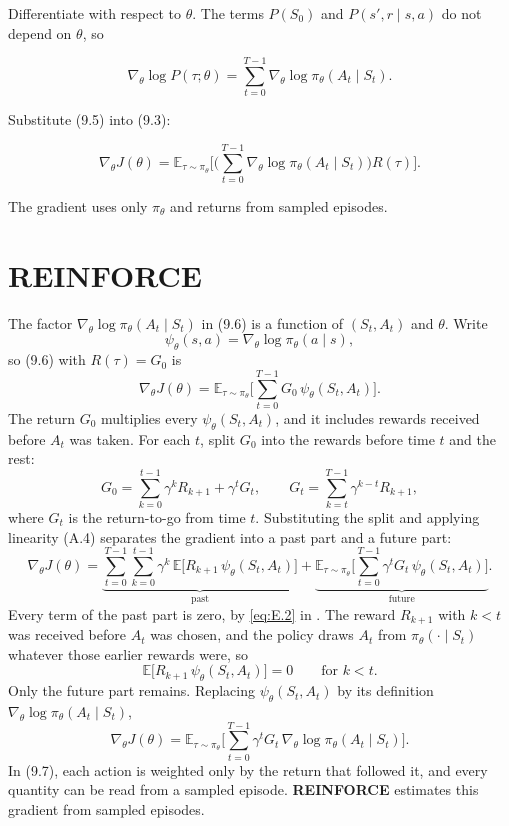 Differentiate with respect to $\theta$. The terms $P(S_0)$ and $P(s',r\mid s,a)$ do not depend on $\theta$, so

\begin{equation}
\nabla_\theta\log P(\tau;\theta)
=
\sum_{t=0}^{T-1}
\nabla_\theta\log\pi_\theta(A_t\mid S_t).
\tag{9.5}
\end{equation}

Substitute (9.5) into (9.3):

\begin{equation}
\nabla_\theta J(\theta)
=
\mathbb{E}_{\tau\sim\pi_\theta}\Biggl[
\Biggl(\sum_{t=0}^{T-1}\nabla_\theta\log\pi_\theta(A_t\mid S_t)\Biggr)
R(\tau)
\Biggr].
\tag{9.6}
\end{equation}

The gradient uses only $\pi_\theta$ and returns from sampled episodes.

\section{REINFORCE}

The factor $\nabla_\theta\log\pi_\theta(A_t\mid S_t)$ in (9.6) is a function of $(S_t,A_t)$ and $\theta$. Write \[
\psi_\theta(s,a)
=
\nabla_\theta\log\pi_\theta(a\mid s),
\] so (9.6) with $R(\tau)=G_0$ is \[
\nabla_\theta J(\theta)
=
\mathbb{E}_{\tau\sim\pi_\theta}\Biggl[
\sum_{t=0}^{T-1}
G_0\,\psi_\theta(S_t,A_t)
\Biggr].
\] The return $G_0$ multiplies every $\psi_\theta(S_t,A_t)$, and it includes rewards received before $A_t$ was taken. For each $t$, split $G_0$ into the rewards before time $t$ and the rest: \[
G_0
=
\sum_{k=0}^{t-1}\gamma^{k}R_{k+1}
+
\gamma^{t}G_t,
\qquad
G_t
=
\sum_{k=t}^{T-1}\gamma^{k-t}R_{k+1},
\] where $G_t$ is the return-to-go from time $t$. Substituting the split and applying linearity (A.4) separates the gradient into a past part and a future part: \[
\nabla_\theta J(\theta)
=
\underbrace{
\sum_{t=0}^{T-1}\sum_{k=0}^{t-1}\gamma^{k}\,
\mathbb{E}\bigl[R_{k+1}\,\psi_\theta(S_t,A_t)\bigr]
}_{\text{past}}
+
\underbrace{
\mathbb{E}_{\tau\sim\pi_\theta}\Biggl[
\sum_{t=0}^{T-1}
\gamma^{t}G_t\,\psi_\theta(S_t,A_t)
\Biggr]
}_{\text{future}}.
\] Every term of the past part is zero, by \eqref{eq:E.2} in . The reward $R_{k+1}$ with $k<t$ was received before $A_t$ was chosen, and the policy draws $A_t$ from $\pi_\theta(\cdot\mid S_t)$ whatever those earlier rewards were, so \[
\mathbb{E}\bigl[R_{k+1}\,\psi_\theta(S_t,A_t)\bigr]
=
0
\qquad\text{for } k<t.
\] Only the future part remains. Replacing $\psi_\theta(S_t,A_t)$ by its definition $\nabla_\theta\log\pi_\theta(A_t\mid S_t)$, \begin{equation}
\nabla_\theta J(\theta)
=
\mathbb{E}_{\tau\sim\pi_\theta}\Biggl[
\sum_{t=0}^{T-1}
\gamma^{t}G_t\,\nabla_\theta\log\pi_\theta(A_t\mid S_t)
\Biggr].
\tag{9.7}
\end{equation} In (9.7), each action is weighted only by the return that followed it, and every quantity can be read from a sampled episode. \textbf{REINFORCE} estimates this gradient from sampled episodes.


